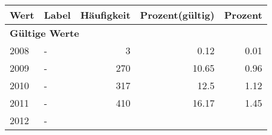      \begin{longtable}{lXrrr}
     \toprule
     \textbf{Wert} & \textbf{Label} & \textbf{Häufigkeit} & \textbf{Prozent(gültig)} & \textbf{Prozent} \\
     \endhead
     \midrule
     \multicolumn{5}{l}{\textbf{Gültige Werte}}\\

     2008 &
     \multicolumn{1}{X}{ -  } &


       \num{3} &
       \num[round-mode=places,round-precision=2]{0,12} &
         \num[round-mode=places,round-precision=2]{0,01} \\

     2009 &
     \multicolumn{1}{X}{ -  } &


       \num{270} &
       \num[round-mode=places,round-precision=2]{10,65} &
         \num[round-mode=places,round-precision=2]{0,96} \\

     2010 &
     \multicolumn{1}{X}{ -  } &


       \num{317} &
       \num[round-mode=places,round-precision=2]{12,5} &
         \num[round-mode=places,round-precision=2]{1,12} \\

     2011 &
     \multicolumn{1}{X}{ -  } &


       \num{410} &
       \num[round-mode=places,round-precision=2]{16,17} &
         \num[round-mode=places,round-precision=2]{1,45} \\

     2012 &
     \multicolumn{1}{X}{ -  } &



\end{longtable}
